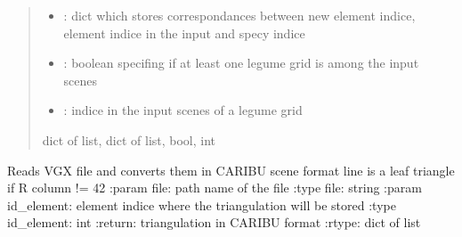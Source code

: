\documentclass[letterpaper,10pt,english]{sphinxmanual}
\begin{document}
\begin{fulllineitems}
\begin{quote}
\begin{description}
\begin{itemize}
\item {} 
\sphinxAtStartPar
{}: dict which stores correspondances between new element indice, element indice in the input and specy indice

\item {} 
\sphinxAtStartPar
{}: boolean specifing if at least one l\sphinxhyphen{}egume grid is among the input scenes

\item {} 
\sphinxAtStartPar
{}: indice in the input scenes of a l\sphinxhyphen{}egume grid

\end{itemize}


\sphinxAtStartPar
dict of list, dict of list, bool, int

\end{description}\end{quote}

\end{fulllineitems}


\begin{fulllineitems}
\label{\detokenize{reference:trianglesmesh.vgx_to_caribu}}
\pysigstartsignatures
{}
\pysigstopsignatures
\sphinxAtStartPar
Reads VGX file and converts them in CARIBU scene format
line is a leaf triangle if R column != 42
:param file: path name of the file
:type file: string
:param id\_element: element indice where the triangulation will be stored
:type id\_element: int
:return: triangulation in CARIBU format 
:rtype: dict of list

\end{fulllineitems}

\end{document}
